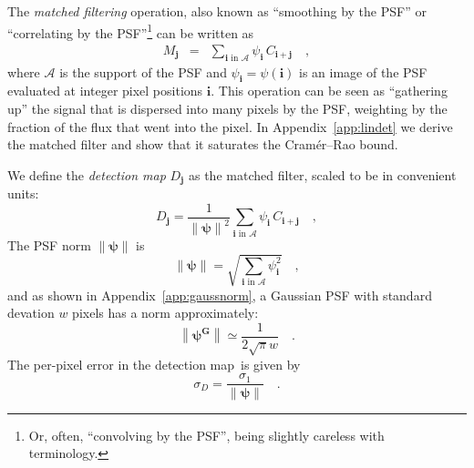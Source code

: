 \documentclass[letterpaper,preprint]{aastex62}
\newcommand{\appref}[1]{\mbox{Appendix~\ref{#1}}}
\newcommand{\detmap}{detection map}
\newcommand{\psf}{\psi}
\newcommand{\psfat}[1]{\psf_{#1}}
\newcommand{\psfnorm}{\norm{\bm{\psf}}}
\newcommand{\norm}[1]{\left\lVert #1 \right\rVert}
\newcommand{\psfw}{w}
\renewcommand{\vec}[1]{\boldsymbol{#1}}
\newcommand{\ivec}{\vec{i}}
\newcommand{\jvec}{\vec{j}}
\newcommand{\iina}{\ivec \,\, \mathrm{in} \,\, \mathcal{A}}
\begin{document}

The \emph{matched filtering} operation, also known as ``smoothing by
the PSF'' or ``correlating by the PSF''\footnote{
  Or, often, ``convolving by the PSF'', being slightly careless with terminology.}
can be written as
\begin{eqnarray}
  M_{\jvec} &=& \sum_{\iina} \psfat{\ivec} \, C_{\ivec + \jvec} \quad ,
\end{eqnarray}
where $\mathcal{A}$ is the support of the PSF and $\psfat{\ivec} =
\psf(\ivec)$ is an image of the PSF evaluated at integer pixel
positions $\ivec$.  This operation can be seen as ``gathering up'' the
signal that is dispersed into many pixels by the PSF, weighting by the
fraction of the flux that went into the pixel.  In
\appref{app:lindet} we derive the matched filter and show that it
saturates the Cram\'er--Rao bound.


We define the \emph{\detmap} $D_{\jvec}$ as the matched filter, scaled to be in convenient units:
\begin{equation}
D_{\jvec} = \frac{1}{\psfnorm^2} \sum_{\iina} \psfat{\ivec} \,
C_{\ivec + \jvec} \quad ,
\label{eq:detmap}
\end{equation}
The PSF norm $\psfnorm$ is
\begin{equation}
\psfnorm = \sqrt{\sum_{\iina} \psfat{\ivec}^2} \quad ,
\end{equation}
and as shown in \appref{app:gaussnorm}, a Gaussian PSF with standard
devation $\psfw$ pixels has a norm approximately:
\begin{equation}
  \norm{\bm{\psf^G}} \simeq \frac{1}{2 \sqrt{\pi} \psfw} \quad .
\end{equation}
The per-pixel error in the \detmap\ is given by
\begin{equation}
\sigma_{D} = \frac{\sigma_1}{\psfnorm} \quad .
\end{equation}
\end{document}
